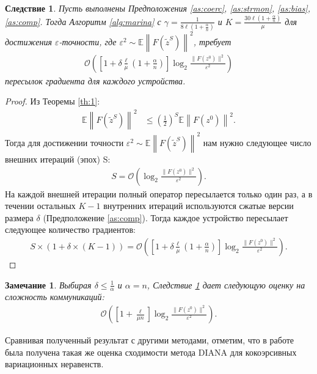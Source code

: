 \documentclass{ProcISPRAS}
\newtheorem{corollary}{Следствие}
\newtheorem{remark}{Замечание}
\begin{document}
\begin{corollary}\label{cor:1}
Пусть выполнены Предположения \ref{as:coerc}, \ref{as:strmon}, \ref{as:bias}, \ref{as:comp}. Тогда Алгоритм \ref{alg:marina} с $\gamma = \frac{1}{8\ell\left(1+\frac{\alpha}{n}\right)}$ и $K = \frac{30\ell\left(1+\frac{\alpha}{n}\right)}{\mu}$ для достижения $\varepsilon$-точности, где $\varepsilon^2\sim\mathbb E\left\|F(\tilde z^S)\right\|^2$, требует
\begin{align*}
    \mathcal{O}\left( \left[1 + \delta\frac{\ell}{\mu}\left(1 + \frac{\alpha}{n}\right) \right]\log_2 \frac{\| F(z^0)\|^2}{\varepsilon^2}\right) 
\end{align*}
пересылок градиента для каждого устройства.
\end{corollary}
\begin{proof}
Из Теоремы \ref{th:1}:
\begin{eqnarray*}
    \mathbb E\left\| F (\tilde z^S) \right\|^2 &\leqslant (\frac{1}{2})^S \mathbb E\left\| F (z^0) \right\|^2.
\end{eqnarray*}
Тогда для достижении точности $\varepsilon^2\sim\mathbb E\left\|F(\tilde z^S)\right\|^2$ нам нужно следующее число внешних итераций (эпох) S:
\begin{align*}
    S = \mathcal{O}\left( \log_2 \frac{\| F(z^0)\|^2}{\varepsilon^2}\right).
\end{align*}
На каждой внешней итерации полный оператор  пересылается только один раз, а в течении остальных $K-1$ внутренних итераций используются сжатые версии размера $\delta$ (Предположение \ref{as:comp}). Тогда каждое устройство пересылает следующее количество градиентов:
\begin{align*}
    S \times \left(1 + \delta \times (K-1)\right) = \mathcal{O}\left( \left[1 + \delta\frac{\ell}{\mu}\left(1 + \frac{\alpha}{n}\right) \right]\log_2 \frac{\| F(z^0)\|^2}{\varepsilon^2}\right).
\end{align*}
\end{proof}
\begin{remark}
Выбирая $\delta \leqslant \frac{1}{\alpha}$ и $\alpha = n$, Следствие \ref{cor:1} дает следующую оценку на сложность коммуникаций:
\begin{align*}
    \mathcal{O}\left( \left[1 + \frac{\ell}{\mu n} \right]\log_2 \frac{\| F(z^0)\|^2}{\varepsilon^2}\right). 
\end{align*}
\end{remark}


Сравнивая полученный результат с другими методами, отметим, что в работе \cite{beznosikov2023stochastic} была получена такая же оценка сходимости метода \textsc{DIANA} для кокоэрсивных вариационных неравенств.
\end{document}

